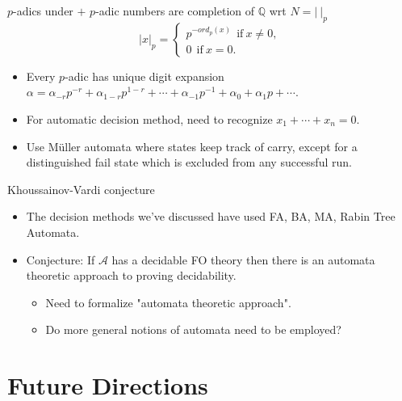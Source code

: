 \documentclass[style=fyma
 ]{powerdot}
\begin{document}
\begin{slide}{$p$-adics under $+$}
  $p$-adic numbers are completion of $\mathbb{Q}$ wrt $N = | ~ |_{p}$
  \begin{equation*}
  |x|_{p} = \begin{cases} 
  p^{-ord_{p}(x)} ~~ \text{if} ~x \neq 0,\\
  0 ~~ \text{if}~x = 0.
  \end{cases}
  \end{equation*}
  \begin{itemize}
    \item Every $p$-adic has unique digit expansion $\alpha= \alpha_{-r} p^{-r} + \alpha_{1-r} p^{1-r} + \cdots + \alpha_{-1} p^{-1} + \alpha_{0} + \alpha_{1} p + \cdots$.
    \item For automatic decision method, need to recognize $x_{1} + \cdots + x_{n} = 0$.
    \item Use M\"uller automata where states keep track of carry, except for a distinguished fail state which is excluded from any successful run.  
  \end{itemize}
\end{slide}

\begin{slide}{Khoussainov-Vardi conjecture}
  \begin{itemize}
    \item The decision methods we've discussed have used FA, BA, MA, Rabin Tree Automata.
    \item Conjecture: If $\mathcal{A}$ has a decidable FO theory then there is an automata theoretic approach to proving decidability.
 
   \begin{itemize}
     \item Need to formalize "automata theoretic approach".
     \item Do more general notions of automata need to be employed?
   \end{itemize}
 
 \end{itemize}
\end{slide}

\section{Future Directions}
\end{document}
